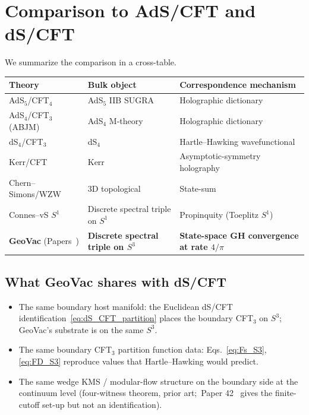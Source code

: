\documentclass[11pt,a4paper]{article}
\theoremstyle{plain}
\theoremstyle{definition}
\newcommand{\sthree}{S^{3}}
\begin{document}
\section{Comparison to AdS/CFT and dS/CFT}
\label{sec:comparison}

We summarize the comparison in a cross-table.

\begin{center}
\begin{tabular}{lll}
\toprule
Theory & Bulk object & Correspondence mechanism \\
\midrule
AdS$_{5}$/CFT$_{4}$~\cite{maldacena1997} & AdS$_{5}$ IIB SUGRA & Holographic dictionary \\
AdS$_{4}$/CFT$_{3}$ (ABJM) & AdS$_{4}$ M-theory & Holographic dictionary \\
dS$_{4}$/CFT$_{3}$~\cite{strominger2001, maldacena2002} & dS$_{4}$ & Hartle--Hawking wavefunctional \\
Kerr/CFT & Kerr & Asymptotic-symmetry holography \\
Chern--Simons/WZW~\cite{witten1989} & 3D topological & State-sum \\
Connes--vS $S^{1}$~\cite{connes_vs2021} & Discrete spectral triple on $S^{1}$ & Propinquity (Toeplitz $S^{1}$) \\
\textbf{GeoVac} (Papers~\cite{paper38, paper50}) & \textbf{Discrete spectral triple on $\sthree$} & \textbf{State-space GH convergence at rate $4/\pi$} \\
\bottomrule
\end{tabular}
\end{center}

\subsection{What GeoVac shares with dS/CFT}

\begin{itemize}
\item The same boundary host manifold: the Euclidean dS/CFT
identification~\eqref{eq:dS_CFT_partition} places the boundary
CFT$_{3}$ on $\sthree$; GeoVac's substrate is on the same $\sthree$.
\item The same boundary CFT$_{3}$ partition function data:
Eqs.~\eqref{eq:Fs_S3}, \eqref{eq:FD_S3} reproduce values that
Hartle--Hawking would predict.
\item The same wedge KMS / modular-flow structure on the boundary side
at the continuum level (four-witness theorem, prior art;\ Paper
42~\cite{paper42} gives the finite-cutoff set-up but not an
identification).
\end{itemize}
\end{document}
